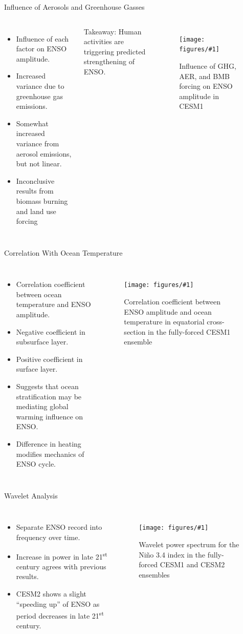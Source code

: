 \documentclass{beamer}
\newcommand{\myfig}[3]{
  \begin{figure}
    \centering
    \texttt{[image: figures/\#1]}
    \caption{#2}
    \label{fig:#3}
  \end{figure}
}
\begin{document}
\begin{frame}{Influence of Aerosols and Greenhouse Gasses}
  \begin{columns}
    \begin{itemize}
    \item Influence of each factor on ENSO amplitude.
    \item Increased variance due to greenhouse gas emissions.
    \item Somewhat increased variance from aerosol emissions, but not linear.
    \item Inconclusive results from biomass burning and land use forcing
    \end{itemize}
    \alert{Takeaway:} Human activities are triggering predicted strengthening of ENSO.
    \myfig{cesm1_sf.pdf}{Influence of GHG, AER, and BMB forcing on ENSO amplitude in CESM1}{cesm1_sf}
  \end{columns}
\end{frame}

\begin{frame}{Correlation With Ocean Temperature}
  \begin{columns}
    \begin{itemize}
    \item Correlation coefficient between ocean temperature and ENSO amplitude.
    \item Negative coefficient in subsurface layer.
    \item Positive coefficient in surface layer.
    \item Suggests that ocean stratification may be mediating global warming influence on ENSO.
    \item Difference in heating modifies mechanics of ENSO cycle.
    \end{itemize}
    \myfig{tempdt.pdf}{Correlation coefficient between ENSO amplitude and ocean temperature in equatorial cross-section in the fully-forced CESM1 ensemble}{tempdt}
  \end{columns}
\end{frame}

\begin{frame}{Wavelet Analysis}
  \begin{columns}
    \begin{itemize}
    \item Separate ENSO record into frequency over time.
    \item Increase in power in late 21\textsuperscript{st} century agrees with previous results.
    \item CESM2 shows a slight ``speeding up'' of ENSO as period decreases in late 21\textsuperscript{st} century.
    \end{itemize}
    \myfig{wavelet2.pdf}{Wavelet power spectrum for the Niño 3.4 index in the fully-forced CESM1 and CESM2 ensembles}{wavelet2}
  \end{columns}
\end{frame}
\end{document}
